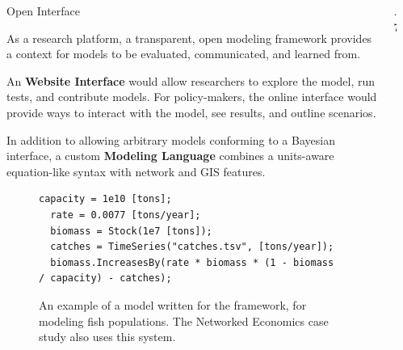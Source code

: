 \documentclass[final]{beamer}
\newlength{\sepwid}
\newlength{\onecolwid}
\newlength{\twocolwid}
\begin{document}
\begin{frame}[fragile]
\begin{columns}[t]
\begin{column}{\onecolwid}
      \begin{alertblock}{Open Interface}

        As a research platform, a transparent, open modeling framework
        provides a context for models to be evaluated, communicated,
        and learned from.

        \vspace{.5cm}
        An {\bf Website Interface} would allow researchers to explore
        the model, run tests, and contribute models.  For
        policy-makers, the online interface would provide ways to
        interact with the model, see results, and outline scenarios.

        \vspace{.5cm}
        In addition to allowing arbitrary models conforming to a
        Bayesian interface, a custom {\bf Modeling Language} combines a
        units-aware equation-like syntax with network and GIS
        features.

        \vspace{.5cm}
        \begin{figure}[h]
\begin{lstlisting}[basicstyle=\footnotesize,breaklines=true,backgroundcolor=\color{white}]
  capacity = 1e10 [tons];
  rate = 0.0077 [tons/year];
  biomass = Stock(1e7 [tons]);
  catches = TimeSeries("catches.tsv", [tons/year]);
  biomass.IncreasesBy(rate * biomass * (1 - biomass / capacity) - catches);
\end{lstlisting}
          \caption*{An example of a model written for the framework,
            for modeling fish populations.  The Networked Economics
            case study also uses this system.}
        \end{figure}

     \end{alertblock}

    \end{column}

    \begin{column}{.7\sepwid}\end{column}			%

    \begin{column}{\twocolwid}

      \vspace{-1.3cm}
      \begin{columns}[t]

    \begin{column}{\onecolwid}


\end{column}
\end{columns}
\end{column}
\end{columns}
\end{frame}
\end{document}
